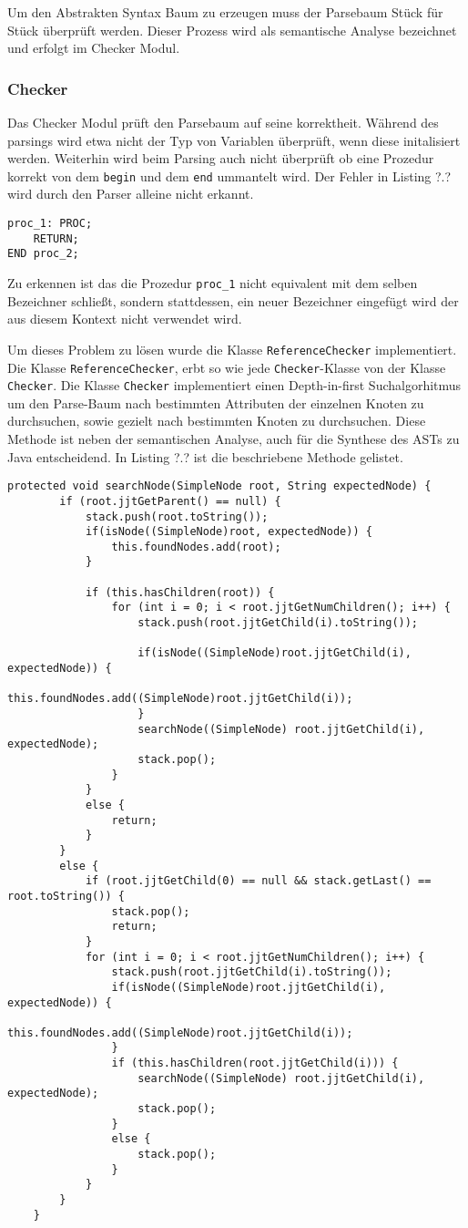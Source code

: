 Um den Abstrakten Syntax Baum zu erzeugen muss der Parsebaum Stück für Stück überprüft werden. Dieser Prozess wird als semantische Analyse bezeichnet und erfolgt im Checker Modul.
 
\subsubsection{Checker}
Das Checker Modul prüft den Parsebaum auf seine korrektheit. Während des parsings wird etwa nicht der Typ von Variablen überprüft, wenn diese initalisiert werden. Weiterhin wird beim Parsing auch nicht überprüft ob eine Prozedur korrekt von dem \verb+begin+ und dem \verb+end+ ummantelt wird. Der Fehler in Listing ?.? wird durch den Parser alleine nicht erkannt.

\begin{verbatim}
proc_1: PROC;
	RETURN;
END proc_2;
\end{verbatim}

Zu erkennen ist das die Prozedur \verb+proc_1+ nicht equivalent mit dem selben Bezeichner schließt, sondern stattdessen, ein neuer Bezeichner eingefügt wird der aus diesem Kontext nicht verwendet wird.



Um dieses Problem zu lösen wurde die Klasse \verb+ReferenceChecker+ implementiert. Die Klasse \verb+ReferenceChecker+, erbt so wie jede \verb+Checker+-Klasse von der Klasse \verb+Checker+.
Die Klasse \verb+Checker+ implementiert einen Depth-in-first Suchalgorhitmus um den Parse-Baum nach bestimmten Attributen der einzelnen Knoten zu durchsuchen, sowie gezielt nach bestimmten Knoten zu durchsuchen. Diese Methode ist neben der semantischen Analyse, auch für die Synthese des ASTs zu Java entscheidend. 
In Listing ?.? ist die beschriebene Methode gelistet.

\begin{verbatim}
protected void searchNode(SimpleNode root, String expectedNode) {
		if (root.jjtGetParent() == null) {
			stack.push(root.toString());
			if(isNode((SimpleNode)root, expectedNode)) {
				this.foundNodes.add(root);
			}
			
			if (this.hasChildren(root)) {
				for (int i = 0; i < root.jjtGetNumChildren(); i++) {
					stack.push(root.jjtGetChild(i).toString());
					
					if(isNode((SimpleNode)root.jjtGetChild(i), expectedNode)) {
						this.foundNodes.add((SimpleNode)root.jjtGetChild(i));
					}		
					searchNode((SimpleNode) root.jjtGetChild(i), expectedNode);
					stack.pop();
				}
			}
			else {
				return;
			}
		}
		else {
			if (root.jjtGetChild(0) == null && stack.getLast() == root.toString()) {
				stack.pop();
				return;
			}
			for (int i = 0; i < root.jjtGetNumChildren(); i++) {
				stack.push(root.jjtGetChild(i).toString());
				if(isNode((SimpleNode)root.jjtGetChild(i), expectedNode)) {
					this.foundNodes.add((SimpleNode)root.jjtGetChild(i));
				}
				if (this.hasChildren(root.jjtGetChild(i))) {
					searchNode((SimpleNode) root.jjtGetChild(i), expectedNode);
					stack.pop();
				}
				else {
					stack.pop();
				}
			}
		}
	}

\end{verbatim}

